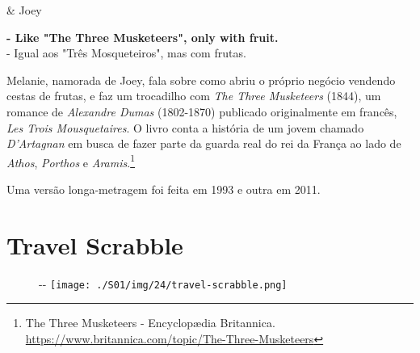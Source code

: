 \begin{tcolorbox}[enhanced,center upper,
    drop fuzzy shadow southeast, boxrule=0.3pt,
    lower separated=false, breakable,
    colframe=black!30!dialogoBorder,colback=white]
\begin{minipage}[c]{0.16\linewidth}
   & \centering \scriptsize{Joey}
\end{minipage}
\hfill
\begin{minipage}[c]{0.8\linewidth}
  \textbf{- Like "The Three Musketeers", only with fruit.}\\
  - Igual aos "Três Mosqueteiros", mas com frutas.
\end{minipage}
\end{tcolorbox}

Melanie, namorada de Joey, fala sobre como abriu o próprio negócio
vendendo cestas de frutas, e faz um trocadilho com \emph{The Three
Musketeers} (1844), um romance de \emph{Alexandre Dumas} (1802-1870)
publicado originalmente em francês, \emph{Les Trois Mousquetaires}. O
livro conta a história de um jovem chamado \emph{D'Artagnan} em busca de
fazer parte da guarda real do rei da França ao lado de \emph{Athos},
\emph{Porthos} e \emph{Aramis}.\footnote{\sloppy The Three Musketeers - Encyclopædia Britannica. \url{https://www.britannica.com/topic/The-Three-Musketeers}}

Uma versão longa-metragem foi feita em 1993 e outra em 2011.

\hypertarget{travel-scrabble}{%
\section{Travel Scrabble}\label{travel-scrabble}}

\begin{figure}[!ht]
  \begin{adjustwidth}{-\oddsidemargin-1in}{-\rightmargin}
    \centering
    \texttt{[image: ./S01/img/24/travel-scrabble.png]}
  \end{adjustwidth}
\end{figure}


